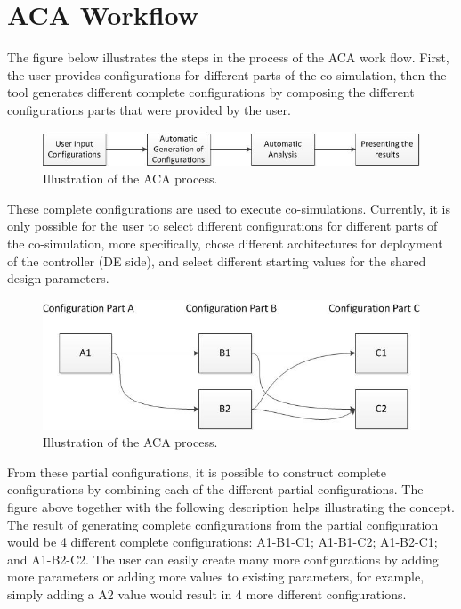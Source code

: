 \documentclass{crescendorepchap}
\begin{document}
\section{ACA Workflow}

The figure below illustrates the steps in the process of the ACA work
flow. First, the user provides configurations for different parts of the
co-simulation, then the tool generates different complete configurations
by composing the different configurations parts that were provided by
the user.

\begin{figure}[htbp]
\centering
\includegraphics[width=.9\textwidth]{images/ACAworkflow.jpg}
\caption{Illustration of the ACA process.}
\end{figure}

These complete configurations are used to execute co-simulations. 
Currently, it is only possible for the user to select different
configurations for different parts of the co-simulation, more
specifically, chose different architectures for deployment of the
controller (DE side), and select different starting values for the
shared design parameters.

\begin{figure}[htbp]
\centering
\includegraphics[width=.9\textwidth]{images/ACAconcept.jpg}
\caption{Illustration of the ACA process.}
\end{figure}

From these partial configurations, it is possible to construct complete
configurations by combining each of the different partial
configurations. The figure above together with the following description
helps illustrating the concept. The result of generating complete
configurations from the partial configuration would be 4 different
complete configurations: A1-B1-C1; A1-B1-C2; A1-B2-C1; and A1-B2-C2. The
user can easily create many more configurations by adding more parameters
or adding more values to existing parameters, for example, simply adding
a A2 value would result in 4 more different configurations.
\end{document}
